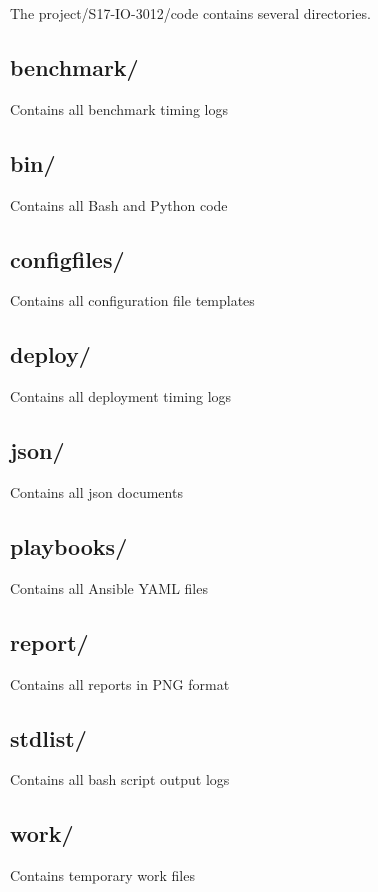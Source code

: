 \documentclass[9pt,twocolumn,twoside]{../../styles/osajnl}
\begin{document}
The project/S17-IO-3012/code contains several directories.   

\subsection{benchmark/} Contains all benchmark timing logs  
\subsection{bin/} Contains all Bash and Python code
\subsection{configfiles/} Contains all configuration file templates
\subsection{deploy/} Contains all deployment timing logs
\subsection{json/} Contains all json documents
\subsection{playbooks/} Contains all Ansible YAML files 
\subsection{report/} Contains all reports in PNG format
\subsection{stdlist/} Contains all bash script output logs
\subsection{work/} Contains temporary work files
\end{document}

